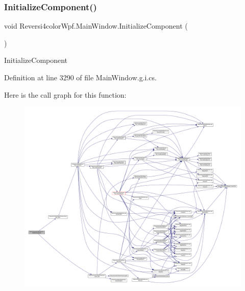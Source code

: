 \subsubsection{\texorpdfstring{Initialize\+Component()}{InitializeComponent()}\hspace{0.1cm}{\footnotesize\ttfamily [1/4]}}
{\footnotesize\ttfamily void Reversi4color\+Wpf.\+Main\+Window.\+Initialize\+Component (\begin{DoxyParamCaption}{ }\end{DoxyParamCaption})}



Initialize\+Component 



Definition at line 3290 of file Main\+Window.\+g.\+i.\+cs.

Here is the call graph for this function\+:
\nopagebreak
\begin{figure}[H]
\begin{center}
\leavevmode
\includegraphics[width=350pt]{class_reversi4color_wpf_1_1_main_window_a20f84946e71f327820f3ccbefca1f3a0_cgraph}
\end{center}
\end{figure}
\mbox{\label{class_reversi4color_wpf_1_1_main_window_a20f84946e71f327820f3ccbefca1f3a0}} 
